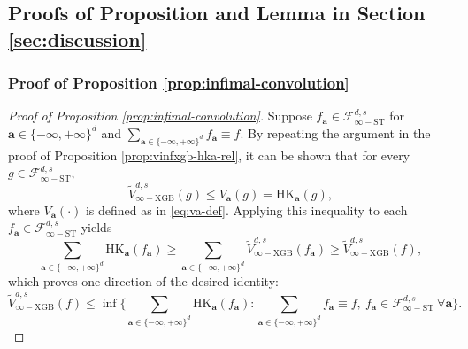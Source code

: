 \documentclass[10pt]{article}
\newcommand{\fstinf}{{\mathcal{F}^{d, s}_{\infty-\text{ST}}}}
\newcommand{\oldvinfxgb}{{\widetilde{V}^{d, s}_{\infty-\text{XGB}}}}
\newcommand{\hk}{{\text{HK}}}
\newcommand{\abf}{{\mathbf{a}}}
\begin{document}
\subsection{Proofs of Proposition and Lemma in Section \ref{sec:discussion}}

\subsubsection{Proof of Proposition \ref{prop:infimal-convolution}}
\label{pf:infimal-convolution}

\begin{proof}[Proof of Proposition \ref{prop:infimal-convolution}]
Suppose $f_{\abf} \in \fstinf$ for  
$\abf \in \{-\infty, +\infty\}^d$ and 
$\sum_{\abf \in \{-\infty, +\infty\}^d} f_{\abf} \equiv f$.
By repeating the argument in the proof of 
Proposition \ref{prop:vinfxgb-hka-rel}, it can be shown that 
for every $g \in \fstinf$,
\begin{equation*}
    \oldvinfxgb(g) \le V_{\abf}(g) = \hk_{\abf}(g),
\end{equation*}
where $V_{\abf}(\cdot)$ is defined as in \eqref{eq:va-def}.
Applying this inequality to each $f_{\abf} \in \fstinf$ yields
\begin{equation*}
    \sum_{\abf \in \{-\infty, +\infty\}^d} 
    \hk_{\abf}(f_{\abf}) 
    \ge \sum_{\abf \in \{-\infty, +\infty\}^d} 
    \oldvinfxgb(f_{\abf}) 
    \ge \oldvinfxgb(f), 
\end{equation*}
which proves one direction of the desired identity:
\begin{equation*}
    \oldvinfxgb(f) \le \inf \Big\{\sum_{\abf \in \{-\infty, +\infty\}^d} 
    \hk_{\abf}(f_{\abf}): 
    \sum_{\abf \in \{-\infty, +\infty\}^d} f_{\abf} \equiv f,
    \ f_{\abf} \in \fstinf \ \forall \abf\Big\}.
\end{equation*}


\end{proof}
\end{document}
